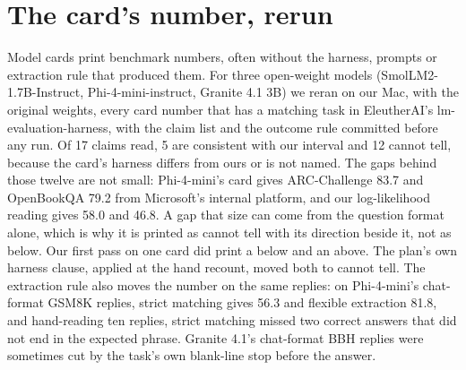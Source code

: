 \section{The card's number, rerun}
Model cards print benchmark numbers, often without the harness, prompts or extraction rule that produced them. For three open-weight models
(SmolLM2-1.7B-Instruct, Phi-4-mini-instruct, Granite 4.1 3B) we reran on our Mac, with the original weights, every card number that has a matching
task in EleutherAI's lm-evaluation-harness, with the claim list and the outcome rule committed before any run. Of 17 claims read, 5 are consistent
with our interval and 12 cannot tell, because the card's harness differs from ours or is not named. The gaps behind those twelve are not small:
Phi-4-mini's card gives ARC-Challenge 83.7 and OpenBookQA 79.2 from Microsoft's internal platform, and our log-likelihood reading gives 58.0 and
46.8. A gap that size can come from the question format alone, which is why it is printed as cannot tell with its direction beside it, not as
below. Our first pass on one card did print a below and an above. The plan's own harness clause, applied at the hand recount, moved both to cannot
tell. The extraction rule also moves the number on the same replies: on Phi-4-mini's chat-format GSM8K replies, strict matching gives 56.3 and
flexible extraction 81.8, and hand-reading ten replies, strict matching missed two correct answers that did not end in the expected phrase. Granite
4.1's chat-format BBH replies were sometimes cut by the task's own blank-line stop before the answer.
